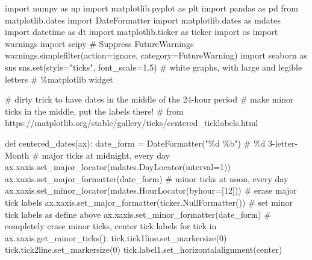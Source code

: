 \documentclass[
  letterpaper,
  DIV=11,
  numbers=noendperiod,
  oneside]{scrreprt}
\newenvironment{Shaded}{\begin{snugshade}}{\end{snugshade}}
\newcommand{\BuiltInTok}[1]{\textcolor[rgb]{0.00,0.23,0.31}{#1}}
\newcommand{\CommentTok}[1]{\textcolor[rgb]{0.37,0.37,0.37}{#1}}
\newcommand{\ControlFlowTok}[1]{\textcolor[rgb]{0.00,0.23,0.31}{#1}}
\newcommand{\DecValTok}[1]{\textcolor[rgb]{0.68,0.00,0.00}{#1}}
\newcommand{\FloatTok}[1]{\textcolor[rgb]{0.68,0.00,0.00}{#1}}
\newcommand{\ImportTok}[1]{\textcolor[rgb]{0.00,0.46,0.62}{#1}}
\newcommand{\KeywordTok}[1]{\textcolor[rgb]{0.00,0.23,0.31}{#1}}
\newcommand{\NormalTok}[1]{\textcolor[rgb]{0.00,0.23,0.31}{#1}}
\newcommand{\OperatorTok}[1]{\textcolor[rgb]{0.37,0.37,0.37}{#1}}
\newcommand{\PreprocessorTok}[1]{\textcolor[rgb]{0.68,0.00,0.00}{#1}}
\newcommand{\SpecialCharTok}[1]{\textcolor[rgb]{0.37,0.37,0.37}{#1}}
\newcommand{\StringTok}[1]{\textcolor[rgb]{0.13,0.47,0.30}{#1}}
\begin{document}
\begin{Shaded}
\begin{Highlighting}[]
\ImportTok{import}\NormalTok{ numpy }\ImportTok{as}\NormalTok{ np}
\ImportTok{import}\NormalTok{ matplotlib.pyplot }\ImportTok{as}\NormalTok{ plt}
\ImportTok{import}\NormalTok{ pandas }\ImportTok{as}\NormalTok{ pd}
\ImportTok{from}\NormalTok{ matplotlib.dates }\ImportTok{import}\NormalTok{ DateFormatter}
\ImportTok{import}\NormalTok{ matplotlib.dates }\ImportTok{as}\NormalTok{ mdates}
\ImportTok{import}\NormalTok{ datetime }\ImportTok{as}\NormalTok{ dt}
\ImportTok{import}\NormalTok{ matplotlib.ticker }\ImportTok{as}\NormalTok{ ticker}
\ImportTok{import}\NormalTok{ os}
\ImportTok{import}\NormalTok{ warnings}
\ImportTok{import}\NormalTok{ scipy}
\CommentTok{\# Suppress FutureWarnings}
\NormalTok{warnings.simplefilter(action}\OperatorTok{=}\StringTok{\textquotesingle{}ignore\textquotesingle{}}\NormalTok{, category}\OperatorTok{=}\PreprocessorTok{FutureWarning}\NormalTok{)}
\ImportTok{import}\NormalTok{ seaborn }\ImportTok{as}\NormalTok{ sns}
\NormalTok{sns.}\BuiltInTok{set}\NormalTok{(style}\OperatorTok{=}\StringTok{"ticks"}\NormalTok{, font\_scale}\OperatorTok{=}\FloatTok{1.5}\NormalTok{)  }\CommentTok{\# white graphs, with large and legible letters}
\CommentTok{\# \%matplotlib widget}
\end{Highlighting}
\end{Shaded}

\begin{Shaded}
\begin{Highlighting}[]
\CommentTok{\# dirty trick to have dates in the middle of the 24{-}hour period}
\CommentTok{\# make minor ticks in the middle, put the labels there!}
\CommentTok{\# from https://matplotlib.org/stable/gallery/ticks/centered\_ticklabels.html}

\KeywordTok{def}\NormalTok{ centered\_dates(ax):}
\NormalTok{    date\_form }\OperatorTok{=}\NormalTok{ DateFormatter(}\StringTok{"}\SpecialCharTok{\%d}\StringTok{ \%b"}\NormalTok{)  }\CommentTok{\# \%d 3{-}letter{-}Month}
    \CommentTok{\# major ticks at midnight, every day}
\NormalTok{    ax.xaxis.set\_major\_locator(mdates.DayLocator(interval}\OperatorTok{=}\DecValTok{1}\NormalTok{))}
\NormalTok{    ax.xaxis.set\_major\_formatter(date\_form)}
    \CommentTok{\# minor ticks at noon, every day}
\NormalTok{    ax.xaxis.set\_minor\_locator(mdates.HourLocator(byhour}\OperatorTok{=}\NormalTok{[}\DecValTok{12}\NormalTok{]))}
    \CommentTok{\# erase major tick labels}
\NormalTok{    ax.xaxis.set\_major\_formatter(ticker.NullFormatter())}
    \CommentTok{\# set minor tick labels as define above}
\NormalTok{    ax.xaxis.set\_minor\_formatter(date\_form)}
    \CommentTok{\# completely erase minor ticks, center tick labels}
    \ControlFlowTok{for}\NormalTok{ tick }\KeywordTok{in}\NormalTok{ ax.xaxis.get\_minor\_ticks():}
\NormalTok{        tick.tick1line.set\_markersize(}\DecValTok{0}\NormalTok{)}
\NormalTok{        tick.tick2line.set\_markersize(}\DecValTok{0}\NormalTok{)}
\NormalTok{        tick.label1.set\_horizontalalignment(}\StringTok{\textquotesingle{}center\textquotesingle{}}\NormalTok{)}
\end{Highlighting}
\end{Shaded}
\end{document}
